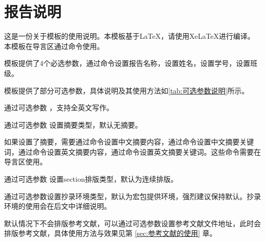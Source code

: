 \documentclass[abstractType=zh,sectionType=next,Reference={ref.bib,ref2.bib}]{MyReport}
\begin{document}
\section{报告说明}

这是一份关于模板的使用说明。本模板基于\LaTeX{}，请使用XeLaTeX进行编译。本模板在导言区通过命令使用。

模板提供了4个必选参数，通过命令\hndm{\titlename{}}设置报告名称，\hndm{\stuname{}}设置姓名，\hndm{\stuID{}}设置学号，\hndm{\stuClass{}}设置班级。

模板提供了部分可选参数，具体说明及其使用方法如\cref{tab:可选参数说明}所示。

\begin{inparaenum}%
    \item 通过可选参数 ，支持全英文写作。

    \item 通过可选参数  设置摘要类型，默认无摘要。

    如果设置了摘要，需要通过命令\hndm{\zhAbstractText{}}设置中文摘要内容，通过命令\hndm{\zhAbstractKey{}}设置中文摘要关键词，通过命令\hndm{\enAbstractText{}}设置英文摘要内容，通过命令\hndm{\enAbstractKey{}}设置英文摘要关键词。这些命令需要在导言区使用。

    \item 通过可选参数  设置section排版类型，默认为连续排版。

    \item 通过可选参数设置抄录环境类型，默认为宏包提供环境，强烈建议保持默认。抄录环境的使用会在后文中详细说明。

    \item 默认情况下不会排版参考文献，可以通过可选参数设置参考文献文件地址，此时会排版参考文献，具体使用方法与效果见第 \ref{sec:参考文献的使用} 章。
\end{inparaenum}
\end{document}
